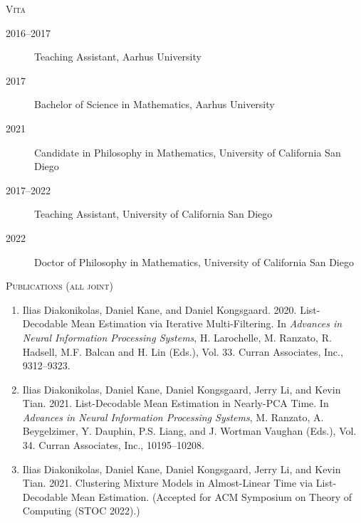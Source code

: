 \documentclass[letterpaper,oneside,english,11pt,openany]{memoir}
\begin{document}


\begin{center}
  \Large\scshape Vita
\end{center}
\begin{description}
  \item[2016--2017] Teaching Assistant, Aarhus University
  \item[2017] Bachelor of Science in Mathematics, Aarhus University
  \item[2021] Candidate in Philosophy in Mathematics, University of California San Diego
  \item[2017--2022] Teaching Assistant, University of California San Diego
  \item[2022] Doctor of Philosophy in Mathematics, University of California San Diego
\end{description}

\begin{center}
  \Large\scshape Publications (all joint)
\end{center}
\begin{enumerate}[$\bullet$]
  \item Ilias Diakonikolas, Daniel Kane, and Daniel Kongsgaard. 2020. List-Decodable Mean Estimation via Iterative Multi-Filtering. In \emph{Advances in Neural Information Processing Systems}, H. Larochelle, M. Ranzato, R. Hadsell, M.F. Balcan and H. Lin (Eds.), Vol. 33. Curran Associates, Inc., 9312--9323.

  \item Ilias Diakonikolas, Daniel Kane, Daniel Kongsgaard, Jerry Li, and Kevin Tian. 2021. List-Decodable Mean Estimation in Nearly-PCA Time. In \emph{Advances in Neural Information Processing Systems}, M. Ranzato, A. Beygelzimer, Y. Dauphin, P.S. Liang, and J. Wortman Vaughan (Eds.), Vol. 34. Curran Associates, Inc., 10195--10208.

  \item Ilias Diakonikolas, Daniel Kane, Daniel Kongsgaard, Jerry Li, and Kevin Tian. 2021. Clustering Mixture Models in Almost-Linear Time via List-Decodable Mean Estimation. (Accepted for ACM Symposium on Theory of Computing (STOC 2022).)
\end{enumerate}


\end{document}
